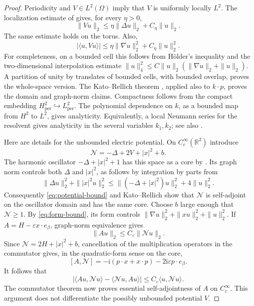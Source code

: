 \documentclass[11pt,a4paper]{article}
\numberwithin{equation}{section}
\newcommand{\R}{\mathbb R}
\newcommand{\ii}{\mathrm i}
\theoremstyle{remark}
\begin{document}
\begin{proof}
Periodicity and $V\in L^2(\Omega)$ imply that $V$ is uniformly locally
$L^2$. The localization estimate of
\cite[Theorem XIII.96]{RS4} gives, for every $\eta>0$,
\begin{equation}\label{eq:potential-bound}
 \|Vu\|_2\leq\eta\|\Delta u\|_2+C_\eta\|u\|_2.
\end{equation}
The same estimate holds on the torus. Also,
\begin{equation}\label{eq:form-bound}
 |\langle u,Vu\rangle|
       \leq\eta\|\nabla u\|_2^2+C_\eta\|u\|_2^2.
\end{equation}
For completeness, on a bounded cell this follows from H\"older's
inequality and the two-dimensional interpolation estimate
$\|u\|_4^2\leq C\|u\|_2(\|\nabla u\|_2+\|u\|_2)$.
A partition of unity by translates of bounded cells, with bounded
overlap, proves the whole-space version. The Kato--Rellich theorem
\cite[Theorem X.12]{RS2}, applied also to $k\cdot p$, proves the domain
and graph-norm claims. Compactness follows from the compact embedding
$H^2_{\mathrm{per}}\hookrightarrow L^2_{\mathrm{per}}$.
The polynomial dependence on $k$, as a bounded map from $H^2$ to $L^2$,
gives analyticity. Equivalently, a local Neumann series for the resolvent
gives analyticity in the several variables $k_1,k_2$; see also
\cite[Section XII.2 and Section XIII.16]{RS4}.

Here are details for the unbounded electric potential. On
$C_c^\infty(\R^2)$ introduce
\[
 \mathcal N=-\Delta+2V+|x|^2+b.
\]
The harmonic oscillator $-\Delta+|x|^2+1$ has this space as a core
by \cite[Theorem X.28]{RS2}. Its graph norm controls both $\Delta$
and $|x|^2$, as follows by integration by parts from
\[
 \|\Delta u\|_2^2+\||x|^2u\|_2^2
    \leq\|(-\Delta+|x|^2)u\|_2^2+4\|u\|_2^2.
\]
Consequently \eqref{eq:potential-bound} and Kato--Rellich show that
$\mathcal N$ is self-adjoint on the oscillator domain and has the same
core. Choose $b$ large enough that $\mathcal N\geq1$. By
\eqref{eq:form-bound}, its form controls
$\|\nabla u\|_2^2+\|xu\|_2^2+\|u\|_2^2$.
If $A=H-\varepsilon x\cdot e_\beta$, graph-norm equivalence gives
\[
 \|Au\|_2\leq C_\varepsilon\|\mathcal N u\|_2.
\]
Since $\mathcal N=2H+|x|^2+b$, cancellation of the multiplication
operators in the commutator gives, in the quadratic-form sense on the
core,
\[
 [A,\mathcal N]
   =-\ii(p\cdot x+x\cdot p)-2\ii\varepsilon p\cdot e_\beta.
\]
It follows that
\[
 |\langle Au,\mathcal N u\rangle
           -\langle\mathcal N u,Au\rangle|
   \leq C_\varepsilon\langle u,\mathcal N u\rangle.
\]
The commutator theorem \cite[Theorem X.37]{RS2} now proves essential
self-adjointness of $A$ on $C_c^\infty$. This argument does not
differentiate the possibly unbounded potential $V$.
\end{proof}
\end{document}

